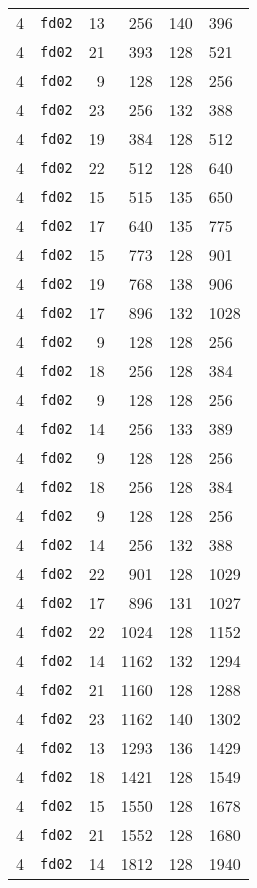 \documentclass{article}
\begin{document}
\begin{table}[h!]
\begin{tabular}{llrrrl}
    4 & \texttt{fd02} & 13 & 256 & 140 & 396 \\
    4 & \texttt{fd02} & 21 & 393 & 128 & 521 \\
    4 & \texttt{fd02} & 9 & 128 & 128 & 256 \\
    4 & \texttt{fd02} & 23 & 256 & 132 & 388 \\
    4 & \texttt{fd02} & 19 & 384 & 128 & 512 \\
    4 & \texttt{fd02} & 22 & 512 & 128 & 640 \\
    4 & \texttt{fd02} & 15 & 515 & 135 & 650 \\
    4 & \texttt{fd02} & 17 & 640 & 135 & 775 \\
    4 & \texttt{fd02} & 15 & 773 & 128 & 901 \\
    4 & \texttt{fd02} & 19 & 768 & 138 & 906 \\
    4 & \texttt{fd02} & 17 & 896 & 132 & 1028 \\
    4 & \texttt{fd02} & 9 & 128 & 128 & 256 \\
    4 & \texttt{fd02} & 18 & 256 & 128 & 384 \\
    4 & \texttt{fd02} & 9 & 128 & 128 & 256 \\
    4 & \texttt{fd02} & 14 & 256 & 133 & 389 \\
    4 & \texttt{fd02} & 9 & 128 & 128 & 256 \\
    4 & \texttt{fd02} & 18 & 256 & 128 & 384 \\
    4 & \texttt{fd02} & 9 & 128 & 128 & 256 \\
    4 & \texttt{fd02} & 14 & 256 & 132 & 388 \\
    4 & \texttt{fd02} & 22 & 901 & 128 & 1029 \\
    4 & \texttt{fd02} & 17 & 896 & 131 & 1027 \\
    4 & \texttt{fd02} & 22 & 1024 & 128 & 1152 \\
    4 & \texttt{fd02} & 14 & 1162 & 132 & 1294 \\
    4 & \texttt{fd02} & 21 & 1160 & 128 & 1288 \\
    4 & \texttt{fd02} & 23 & 1162 & 140 & 1302 \\
    4 & \texttt{fd02} & 13 & 1293 & 136 & 1429 \\
    4 & \texttt{fd02} & 18 & 1421 & 128 & 1549 \\
    4 & \texttt{fd02} & 15 & 1550 & 128 & 1678 \\
    4 & \texttt{fd02} & 21 & 1552 & 128 & 1680 \\
    4 & \texttt{fd02} & 14 & 1812 & 128 & 1940 \\

\end{tabular}
\end{table}
\end{document}
